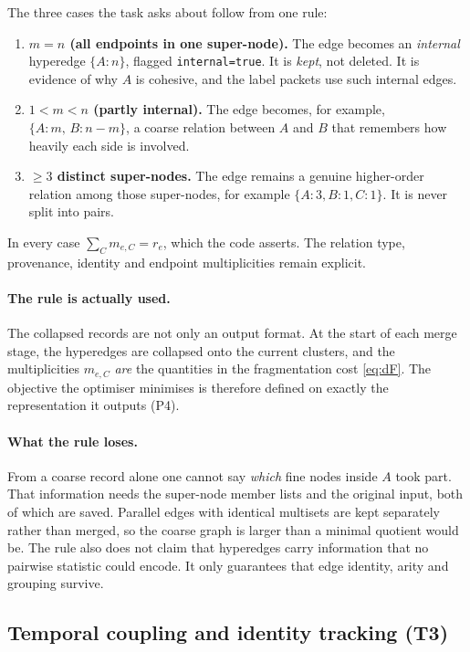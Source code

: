 \documentclass[11pt,a4paper]{article}
\newcommand{\cref}[1]{\autoref{#1}}
\theoremstyle{remark}
\newcommand{\code}[1]{\texttt{\small #1}}
\begin{document}
The three cases the task asks about follow from one rule:

\begin{enumerate}
  \item \textbf{$m=n$ (all endpoints in one super-node).} The edge becomes an
        \emph{internal} hyperedge $\{A{:}n\}$, flagged \code{internal=true}. It is
        \emph{kept}, not deleted. It is evidence of why $A$ is cohesive, and the
        label packets use such internal edges.
  \item \textbf{$1<m<n$ (partly internal).} The edge becomes, for example,
        $\{A{:}m,\,B{:}n-m\}$, a coarse relation between $A$ and $B$ that remembers
        how heavily each side is involved.
  \item \textbf{$\ge3$ distinct super-nodes.} The edge remains a genuine
        higher-order relation among those super-nodes, for example
        $\{A{:}3,B{:}1,C{:}1\}$. It is never split into pairs.
\end{enumerate}

In every case $\sum_C m_{e,C}=r_e$, which the code asserts. The relation type,
provenance, identity and endpoint multiplicities remain explicit.

\paragraph{The rule is actually used.}
The collapsed records are not only an output format. At the start of each merge stage,
the hyperedges are collapsed onto the current clusters, and the multiplicities
$m_{e,C}$ \emph{are} the quantities in the fragmentation cost \cref{eq:dF}. The objective
the optimiser minimises is therefore defined on exactly the representation it outputs
(P4).

\paragraph{What the rule loses.}
From a coarse record alone one cannot say \emph{which} fine nodes inside $A$ took part.
That information needs the super-node member lists and the original input, both of
which are saved. Parallel edges with identical multisets are kept separately rather than
merged, so the coarse graph is larger than a minimal quotient would be. The rule also
does not claim that hyperedges carry information that no pairwise statistic could encode.
It only guarantees that edge identity, arity and grouping survive.

\subsection{Temporal coupling and identity tracking (T3)}
\end{document}
